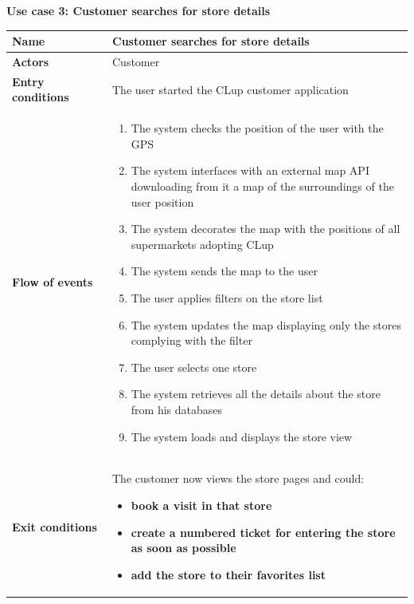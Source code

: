 \clearpage
\textbf{Use case 3: Customer searches for store details}
\smallskip
{}
\begin{longtable}{p{0.25\linewidth}p{0.75\linewidth}}
    \toprule
    \textbf{Name}                             & \textbf{Customer searches for store details}      \\
    \midrule
    \textbf{Actors}                           & Customer                                          \\
    \midrule
    \textbf{Entry conditions}                 & The user started the CLup customer application    \\
    \midrule
    \textbf{Flow of events}                   &
    \begin{enumerate}
        \item The system checks the position of the user with the GPS
        \item The system interfaces with an external map API downloading from it a map of the surroundings of the user position
        \item The system decorates the map with the positions of all supermarkets adopting CLup
        \item The system sends the map to the user
        \item The user applies filters on the store list
        \item The system updates the map displaying only the stores complying with the filter
        \item The user selects one store
        \item The system retrieves all the details about the store from his databases
        \item The system loads and displays the store view
    \end{enumerate}                                                                     \\
    \midrule
    \textbf{Exit conditions}                  & The customer now views the store pages and could:
    \begin{itemize}
        \item \textbf{book a visit in that store}
        \item \textbf{create a numbered ticket for entering the store as soon as possible}
        \item \textbf{add the store to their favorites list}
    \end{itemize}                                                                     \\

\end{longtable}
